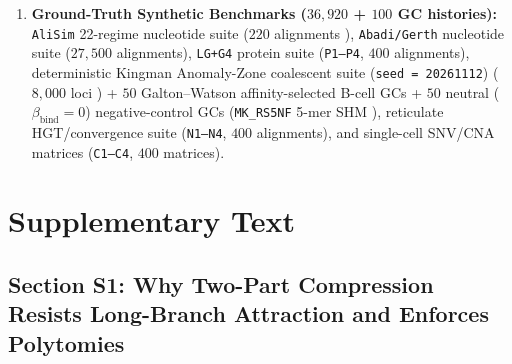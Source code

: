 \documentclass[12pt]{article}
\begin{document}
\begin{enumerate}
    \item \textbf{Ground-Truth Synthetic Benchmarks ($36,920$ + $100$ GC histories):} \texttt{AliSim} 22-regime nucleotide suite ($220$ alignments \cite{lytrong2022alisim}), \texttt{Abadi/Gerth} nucleotide suite ($27,500$ alignments), \texttt{LG+G4} protein suite (\texttt{P1--P4}, $400$ alignments), deterministic Kingman Anomaly-Zone coalescent suite (\texttt{seed = 20261112}) ($8,000$ loci \cite{degnan2006discordance}) + $50$ Galton--Watson affinity-selected B-cell GCs + $50$ neutral ($\beta_{\text{bind}} = 0$) negative-control GCs (\texttt{MK\_RS5NF} 5-mer SHM \cite{dewitt2018gctree}), reticulate HGT/convergence suite (\texttt{N1--N4}, $400$ alignments), and single-cell SNV/CNA matrices (\texttt{C1--C4}, $400$ matrices).
\end{enumerate}

\section*{Supplementary Text}

\subsection*{Section S1: Why Two-Part Compression Resists Long-Branch Attraction and Enforces Polytomies}
\end{document}
